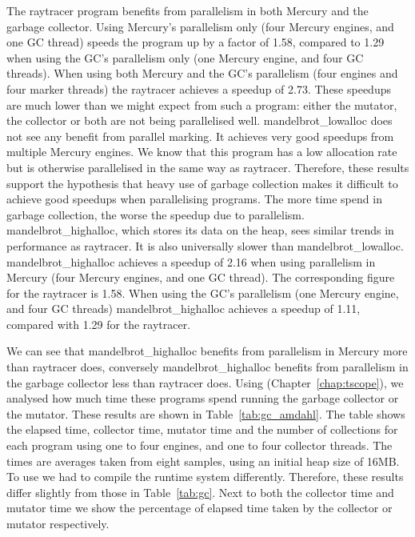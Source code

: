 The raytracer program benefits from parallelism in both Mercury and the
garbage collector.
Using Mercury's parallelism only (four Mercury engines, and one GC thread) 
speeds the program up by a factor of 1.58,
compared to 1.29 when using the GC's parallelism only (one Mercury engine,
and four GC threads).
When using both Mercury and the GC's parallelism (four engines and four
marker threads)
the raytracer achieves a speedup of 2.73.
These speedups are much lower than we might expect from such a program:
either the mutator, the collector or both are not being parallelised well.
mandelbrot\_lowalloc does not see any benefit from parallel marking.
It achieves very good speedups from multiple Mercury engines.
We know that this program has a low allocation rate
but is otherwise parallelised in the same way as raytracer.
Therefore,
these results support the hypothesis that heavy use of garbage collection
makes it difficult to achieve good speedups when parallelising programs.
The more time spend in garbage collection,
the worse the speedup due to parallelism.
mandelbrot\_highalloc, which stores its data on the heap,
sees similar trends in performance as raytracer.
It is also universally slower than mandelbrot\_lowalloc.
mandelbrot\_highalloc achieves a speedup of 2.16 when using parallelism in
Mercury (four Mercury engines, and one GC thread).
The corresponding figure for the raytracer is 1.58.
When using the GC's parallelism
(one Mercury engine, and four GC threads)
mandelbrot\_highalloc achieves a speedup of 1.11,
compared with 1.29 for the raytracer.



We can see that mandelbrot\_highalloc benefits from parallelism in Mercury
more than raytracer does,
conversely mandelbrot\_highalloc benefits from parallelism in the garbage
collector less than raytracer does.
Using \tscope (Chapter~\ref{chap:tscope}),
we analysed how much time these programs spend running the garbage collector
or the mutator.
These results are shown in Table~\ref{tab:gc_amdahl}.
The table shows the elapsed time, collector time, mutator time and the
number of collections for each program using one to four engines, and one
to four collector threads.
The times are averages taken from eight samples,
using an initial heap size of 16MB.
To use \tscope we had to compile the runtime system differently.
Therefore,
these results differ slightly from those in Table~\ref{tab:gc}.
Next to both the collector time and mutator time
we show the percentage of elapsed time taken by the collector or mutator
respectively.

